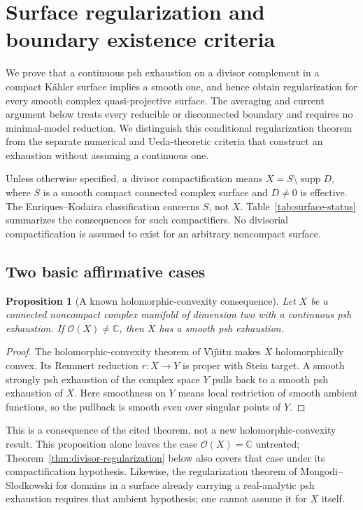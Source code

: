 \documentclass[11pt]{amsart}
\newtheorem{proposition}[theorem]{Proposition}
\theoremstyle{definition}
\theoremstyle{remark}
\numberwithin{equation}{section}
\newcommand{\C}{\mathbb C}
\newcommand{\OO}{\mathcal O}
\newcommand{\supp}{\operatorname{supp}}
\begin{document}
\section{Surface regularization and boundary existence criteria}\label{sec:surfaces}
We prove that a continuous psh exhaustion on a divisor complement in
a compact K\"ahler surface implies a smooth one, and hence obtain
regularization for every smooth complex quasi-projective surface.
The averaging and current argument below treats every reducible or
disconnected boundary and requires no minimal-model reduction.
We distinguish this conditional regularization theorem from the
separate numerical and Ueda-theoretic criteria that construct an
exhaustion without assuming a continuous one.

Unless otherwise specified, a divisor compactification means
$X=S\setminus\supp D$, where $S$ is a smooth compact connected
complex surface and $D\ne0$ is effective. The Enriques--Kodaira
classification concerns $S$, not $X$. Table~\ref{tab:surface-status}
summarizes the consequences for such compactifiers. No divisorial
compactification is assumed to exist for an arbitrary noncompact
surface.

\subsection{Two basic affirmative cases}\label{sec:surface-curves}

\begin{proposition}[A known holomorphic-convexity consequence]
\label{prop:surface-nonconstant-function}
Let $X$ be a connected noncompact complex manifold of dimension two
with a continuous psh exhaustion. If $\OO(X)\ne\C$, then $X$ has a smooth psh exhaustion.
\end{proposition}
\begin{proof}
The holomorphic-convexity theorem of V\^{\i}j\^{\i}itu
\cite[Theorem~1.1]{Vajaitu2022} makes $X$ holomorphically convex.
Its Remmert reduction $r:X\to Y$ is proper with Stein target. A smooth
strongly psh exhaustion of the complex space $Y$ pulls back to a smooth
psh exhaustion of $X$. Here smoothness on $Y$ means local restriction
of smooth ambient functions, so the pullback is smooth even over
singular points of $Y$.
\end{proof}

This is a consequence of the cited theorem, not a new
holomorphic-convexity result. This proposition alone leaves the case $\OO(X)=\C$
untreated; Theorem~\ref{thm:divisor-regularization} below also covers
that case under its compactification hypothesis.
Likewise, the regularization theorem of Mongodi--Slodkowski for domains
in a surface already carrying a real-analytic psh exhaustion
\cite[Corollaries~4.4--4.5]{MongodiSlodkowski2020} requires that ambient
hypothesis; one cannot assume it for $X$ itself.
\end{document}

